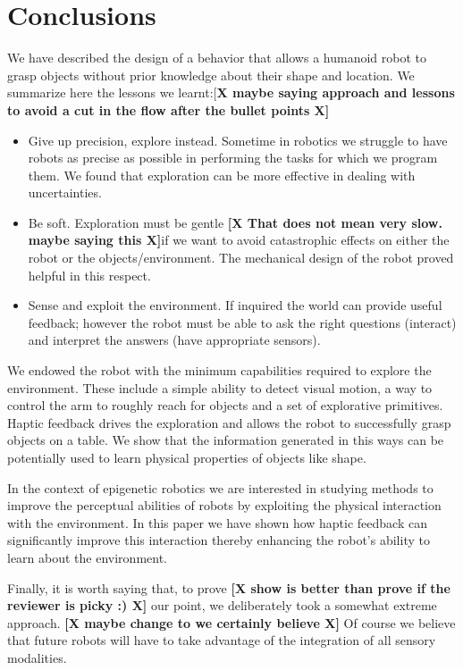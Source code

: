 \section{Conclusions}
\label{sec:conclusions}

We have described the design of a behavior that allows a humanoid
robot to grasp objects without prior knowledge about their shape
and location. We summarize here the lessons we learnt:[\textbf{X
maybe saying approach and lessons to avoid a cut in the flow after
the bullet points X]}
\begin{itemize}

\item Give up precision, explore instead. Sometime in robotics
we struggle to have robots as precise as possible in performing
the tasks for which we program them. We found that exploration
can be more effective in dealing with uncertainties.

\item Be soft. Exploration must be gentle \textbf{[X That does not
mean very slow. maybe saying this X]}if we want to avoid
catastrophic effects on either the robot or the
objects/environment. The mechanical design of the robot proved
helpful in this respect.

\item Sense and exploit the environment. If inquired the world
can provide useful feedback; however the robot must be able
to ask the right questions (interact) and interpret the answers
(have appropriate sensors).

\end{itemize}

We endowed the robot with the minimum capabilities required to explore
the environment. These include a simple ability to detect visual
motion, a way to control the arm to roughly reach for objects and a
set of explorative primitives. Haptic feedback drives the
exploration and allows the robot to successfully grasp objects on
a table. We show that the information generated in this ways
can be potentially used to learn physical properties of objects like shape.

In the context of epigenetic robotics we are interested in studying
methods to improve the perceptual abilities of robots by exploiting the
physical interaction with the environment. In this paper we have shown
how haptic feedback can significantly improve this interaction thereby
enhancing the robot's ability to learn about the environment.

Finally, it is worth saying that, to prove \textbf{[X show is
better than prove if the reviewer is picky :) X]} our point, we
deliberately took a somewhat extreme approach. \textbf{[X maybe
change to we certainly believe X]} Of course we believe that
future robots will have to take advantage of the integration of
all sensory modalities.

